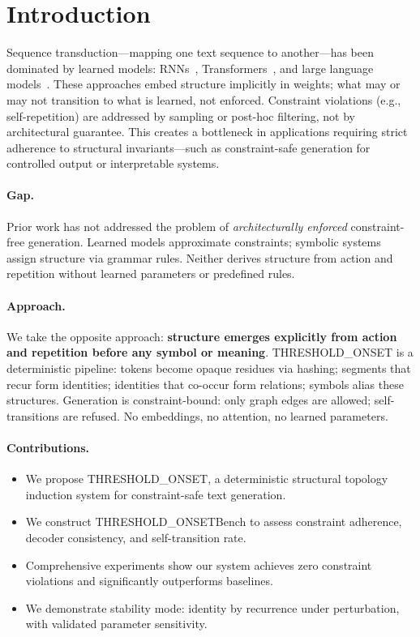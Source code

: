 \documentclass[10pt]{article}
\begin{document}
\section{Introduction}

Sequence transduction—mapping one text sequence to another—has been dominated by learned models: RNNs~\cite{hochreiter1997long}, Transformers~\cite{vaswani2017attention}, and large language models~\cite{raffel2019t5}. These approaches embed structure implicitly in weights; what may or may not transition to what is learned, not enforced. Constraint violations (e.g., self-repetition) are addressed by sampling or post-hoc filtering, not by architectural guarantee. This creates a bottleneck in applications requiring strict adherence to structural invariants—such as constraint-safe generation for controlled output or interpretable systems.

\paragraph{Gap.} Prior work has not addressed the problem of \emph{architecturally enforced} constraint-free generation. Learned models approximate constraints; symbolic systems~\cite{chomsky1957syntactic} assign structure via grammar rules. Neither derives structure from action and repetition without learned parameters or predefined rules.

\paragraph{Approach.} We take the opposite approach: \textbf{structure emerges explicitly from action and repetition before any symbol or meaning}. THRESHOLD\_ONSET is a deterministic pipeline: tokens become opaque residues via hashing; segments that recur form identities; identities that co-occur form relations; symbols alias these structures. Generation is constraint-bound: only graph edges are allowed; self-transitions are refused. No embeddings, no attention, no learned parameters.

\paragraph{Contributions.}
\begin{itemize}
\item We propose THRESHOLD\_ONSET, a deterministic structural topology induction system for constraint-safe text generation.
\item We construct THRESHOLD\_ONSETBench to assess constraint adherence, decoder consistency, and self-transition rate.
\item Comprehensive experiments show our system achieves zero constraint violations and significantly outperforms baselines.
\item We demonstrate stability mode: identity by recurrence under perturbation, with validated parameter sensitivity.
\end{itemize}
\end{document}
